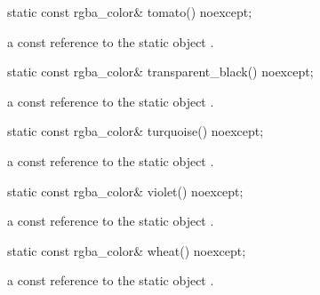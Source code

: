 \begin{itemdecl}
    static const rgba_color& tomato() noexcept;
\end{itemdecl}
\begin{itemdescr}
    \pnum
    \returns
    a const reference to the static  object .
\end{itemdescr}

\begin{itemdecl}
    static const rgba_color& transparent_black() noexcept;
\end{itemdecl}
\begin{itemdescr}
    \pnum
    \returns
    a const reference to the static  object .
\end{itemdescr}

\begin{itemdecl}
    static const rgba_color& turquoise() noexcept;
\end{itemdecl}
\begin{itemdescr}
    \pnum
    \returns
    a const reference to the static  object .
\end{itemdescr}

\begin{itemdecl}
    static const rgba_color& violet() noexcept;
\end{itemdecl}
\begin{itemdescr}
    \pnum
    \returns
    a const reference to the static  object .
\end{itemdescr}

\begin{itemdecl}
    static const rgba_color& wheat() noexcept;
\end{itemdecl}
\begin{itemdescr}
    \pnum
    \returns
    a const reference to the static  object .
\end{itemdescr}

